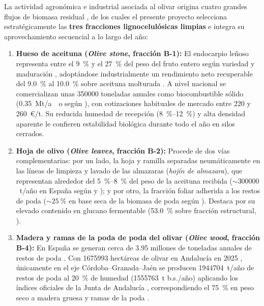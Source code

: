 \documentclass{report}
\begin{document}
La actividad agronómica e industrial asociada al olivar origina cuatro grandes flujos de biomasa residual \autocite{RomeroGarcia2014, Manzanares2017, MoranAlarcon2026}, de los cuales el presente proyecto selecciona estratégicamente las \textbf{tres fracciones lignocelulósicas limpias} e integra su aprovechamiento secuencial a lo largo del año:
\begin{enumerate}
    \item \textbf{Hueso de aceituna (\textit{Olive stone}, fracción B-1):} El endocarpio leñoso representa entre el \SI{9}{\percent} y el \SI{27}{\percent} del peso del fruto entero según variedad y maduración \autocite[Secciones~1--2]{ElFessikh2025}, adoptándose industrialmente un rendimiento neto recuperable del \SI{9.0}{\percent} al \SI{10.0}{\percent} sobre aceituna molturada \autocite{RomeroGarcia2016, Padilla-Rascon2022}. A nivel nacional se comercializan unas \num{350000} toneladas anuales como biocombustible sólido (\SI{0.35}{Mt/ao} según \textcite[Sección~3.1]{MoranAlarcon2026}), con cotizaciones habituales de mercado entre \num{220} y \num{260}~€/t. Su reducida humedad de recepción (\SI{8}{\percent}--\SI{12}{\percent}) y alta densidad aparente le confieren estabilidad biológica durante todo el año en silos cerrados.
    \item \textbf{Hoja de olivo (\textit{Olive leaves}, fracción B-2):} Procede de dos vías complementarias: por un lado, la hoja y ramilla separadas neumáticamente en las líneas de limpieza y lavado de las almazaras (\textit{hojín de almazara}), que representan alrededor del \SI{5}{\percent}--\SI{8}{\percent} del peso de la aceituna recibida ($\sim \num{300000}$~t/año en España según \textcite[Sección~3.1]{MoranAlarcon2026} y \textcite{RomeroGarcia2014}); y por otro, la fracción foliar adherida a los restos de poda ($\sim \SI{25}{\percent}$ en base seca de la biomasa de poda según \textcite{RomeroGarcia2014}). Destaca por su elevado contenido en glucano fermentable (\SI{53.0}{\percent} sobre fracción estructural, \textcite[Tabla~2]{Jafari-Gohargan2026}).
    \item \textbf{Madera y ramas de la poda de poda del olivar (\textit{Olive wood}, fracción B-4):} En España se generan cerca de \num{3.95} millones de toneladas anuales de restos de poda \autocite[Sección~3.1]{MoranAlarcon2026}. Con \num{1675993} hectáreas de olivar en Andalucía en 2025 \autocite[Hoja~\texttt{TABLA PROVINCIAL CULTIVOS}, código \texttt{OL1000}]{MAPA2025}, únicamente en el eje Córdoba--Granada--Jaén se producen \num{1944704}~t/año de restos de poda al \SI{20}{\percent} de humedad (\num{1555763}~t b.s./año) aplicando los índices oficiales de la Junta de Andalucía \autocite[Sección~3.1.2, Tabla~3]{CAP2008}, correspondiendo el \SI{75}{\percent} en peso seco a madera gruesa y ramas de la poda \autocite{RomeroGarcia2014}.

\end{enumerate}
\end{document}
